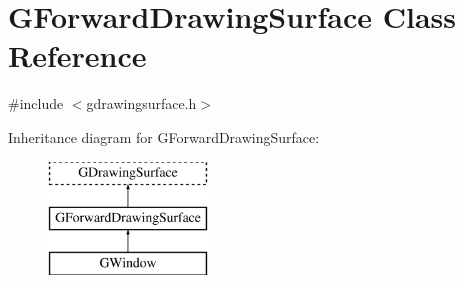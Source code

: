 \hypertarget{classGForwardDrawingSurface}{}\section{G\+Forward\+Drawing\+Surface Class Reference}
\label{classGForwardDrawingSurface}


{\ttfamily \#include $<$gdrawingsurface.\+h$>$}

Inheritance diagram for G\+Forward\+Drawing\+Surface\+:\begin{figure}[H]
\begin{center}
\leavevmode
\includegraphics[height=3.000000cm]{classGForwardDrawingSurface}
\end{center}
\end{figure}
